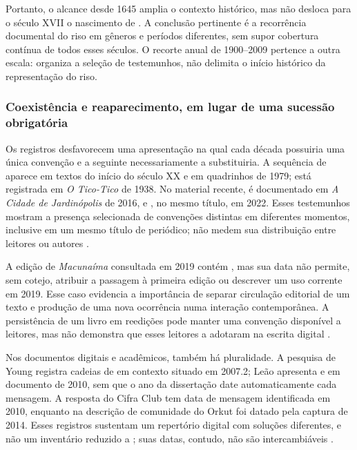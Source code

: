 Portanto, o alcance desde 1645 amplia o contexto histórico, mas não desloca para o século XVII o nascimento de . A conclusão pertinente é a recorrência documental do riso em gêneros e períodos diferentes, sem supor cobertura contínua de todos esses séculos. O recorte anual de 1900--2009 pertence a outra escala: organiza a seleção de testemunhos, não delimita o início histórico da representação do riso.

\subsubsection{Coexistência e reaparecimento, em lugar de uma sucessão obrigatória}
Os registros desfavorecem uma apresentação na qual cada década possuiria uma única convenção e a seguinte necessariamente a substituiria. A sequência de  aparece em textos do início do século XX e em quadrinhos de 1979;  está registrada em \textit{O Tico-Tico} de 1938. No material recente,  é documentado em \textit{A Cidade de Jardinópolis} de 2016, e , no mesmo título, em 2022. Esses testemunhos mostram a presença selecionada de convenções distintas em diferentes momentos, inclusive em um mesmo título de periódico; não medem sua distribuição entre leitores ou autores \cite{queiros1901,anual1938,correio1979,r3doc18,r3doc19}.

A edição de \textit{Macunaíma} consultada em 2019 contém , mas sua data não permite, sem cotejo, atribuir a passagem à primeira edição ou descrever um uso corrente em 2019. Esse caso evidencia a importância de separar circulação editorial de um texto e produção de uma nova ocorrência numa interação contemporânea. A persistência de um livro em reedições pode manter uma convenção disponível a leitores, mas não demonstra que esses leitores a adotaram na escrita digital \cite{andrade2019}.

Nos documentos digitais e acadêmicos, também há pluralidade. A pesquisa de Young registra cadeias de  em contexto situado em 2007.2; Leão apresenta  e  em documento de 2010, sem que o ano da dissertação date automaticamente cada mensagem. A resposta do Cifra Club tem data de mensagem identificada em 2010, enquanto  na descrição de comunidade do Orkut foi datado pela captura de 2014. Esses registros sustentam um repertório digital com soluções diferentes, e não um inventário reduzido a ; suas datas, contudo, não são intercambiáveis \cite{young2008,leao2010,r4forumcifraclub,r4orkutcomunidades}.

